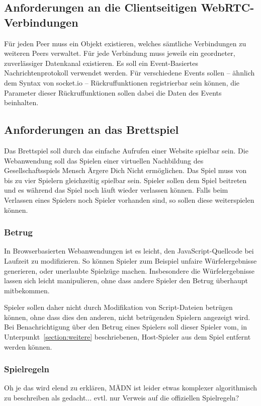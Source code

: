 \subsection{Anforderungen an die Clientseitigen WebRTC-Verbindungen}
Für jeden Peer muss ein Objekt existieren, welches sämtliche Verbindungen zu weiteren Peers verwaltet. Für jede Verbindung muss jeweils ein geordneter, zuverlässiger Datenkanal existieren. Es soll ein Event-Basiertes Nachrichtenprotokoll verwendet werden. Für verschiedene Events sollen -- ähnlich dem Syntax von socket.io -- Rückruffunktionen registrierbar sein können, die Parameter dieser Rückruffunktionen sollen dabei die Daten des Events beinhalten.

\subsection{Anforderungen an das Brettspiel}
Das Brettspiel soll durch das einfache Aufrufen einer Website spielbar sein. Die Webanwendung soll das Spielen einer virtuellen Nachbildung des Gesellschaftsspiels \glqq{}Mensch Ärgere Dich Nicht\grqq{} ermöglichen. Das Spiel muss von bis zu vier Spielern gleichzeitig spielbar sein. Spieler sollen dem Spiel beitreten und es während das Spiel noch läuft wieder verlassen können. Falls beim Verlassen eines Spielers noch Spieler vorhanden sind, so sollen diese weiterspielen können. 

\subsubsection{Betrug}
In Browserbasierten Webanwendungen ist es leicht, den JavaScript-Quellcode bei Laufzeit zu modifizieren. So können Spieler zum Beispiel unfaire Würfelergebnisse generieren, oder unerlaubte Spielzüge machen. Insbesondere die Würfelergebnisse lassen sich leicht manipulieren, ohne dass andere Spieler den Betrug überhaupt mitbekommen.\par

Spieler sollen daher nicht durch Modifikation von Script-Dateien betrügen können, ohne dass dies den anderen, nicht betrügenden Spielern angezeigt wird. Bei Benachrichtigung über den Betrug eines Spielers soll dieser Spieler vom, in Unterpunkt~\ref{section:weitere} beschriebenen, \glqq{}Host\grqq{}-Spieler aus dem Spiel entfernt werden können.\par

\subsubsection{Spielregeln}
Oh je das wird elend zu erklären, MÄDN ist leider etwas komplexer algorithmisch zu beschreiben als gedacht... evtl. nur Verweis auf die offiziellen Spielregeln?

